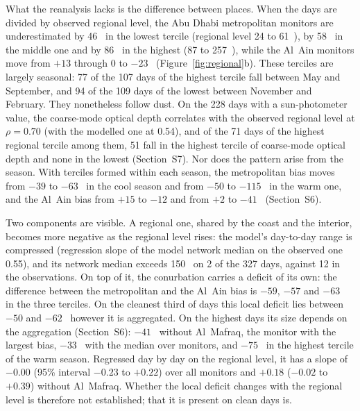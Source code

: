 What the reanalysis lacks is the difference between places. When the days are divided by
observed regional level, the Abu Dhabi
metropolitan monitors are underestimated by 46~\ugm{} in the lowest tercile (regional level 24 to
61~\ugm{}), by 58~\ugm{} in the middle one and by 86~\ugm{} in the highest (87 to 257~\ugm{}),
while the Al~Ain monitors move from $+13$ through 0 to $-23$~\ugm{}
(Figure~\ref{fig:regional}b). These terciles are largely seasonal: 77 of the 107 days of the
highest tercile fall between May and September, and 94 of the 109 days of the lowest between
November and February. They nonetheless follow dust. On the 228 days with a sun-photometer
value, the coarse-mode optical depth correlates with the observed regional level at
$\rho=0.70$ (with the modelled one at 0.54), and of the 71 days of the highest regional tercile
among them, 51 fall in the highest tercile of coarse-mode optical depth and none in the lowest
(Section~S7). Nor does the pattern arise from the season. With terciles formed
within each season, the metropolitan bias moves from $-39$ to $-63$~\ugm{} in the cool season and
from $-50$ to $-115$~\ugm{} in the warm one, and the Al~Ain bias from $+15$ to $-12$ and from $+2$
to $-41$~\ugm{} (Section~S6).

Two components are visible. A regional one, shared by the coast and
the interior, becomes more negative as the regional level rises: the model's day-to-day range is
compressed (regression slope of the model network median on the observed one 0.55), and its
network median exceeds 150~\ugm{} on 2 of the 327 days, against 12 in the observations. On top
of it, the conurbation carries a deficit of its own: the difference between the metropolitan and
the Al~Ain bias is $-59$, $-57$ and $-63$~\ugm{} in the three terciles. On the cleanest third of
days this local deficit lies between $-50$ and $-62$~\ugm{} however it is aggregated. On the
highest days its size depends on the aggregation (Section~S6): $-41$~\ugm{} without Al~Mafraq,
the monitor with the largest bias, $-33$~\ugm{} with the median over monitors, and $-75$~\ugm{}
in the highest tercile of the warm season. Regressed day by day on the regional level, it has a
slope of $-0.00$ (95\% interval $-0.23$ to $+0.22$) over all monitors and $+0.18$ ($-0.02$ to
$+0.39$) without Al~Mafraq. Whether the local deficit changes with the regional level is
therefore not established; that it is present on clean days is.

